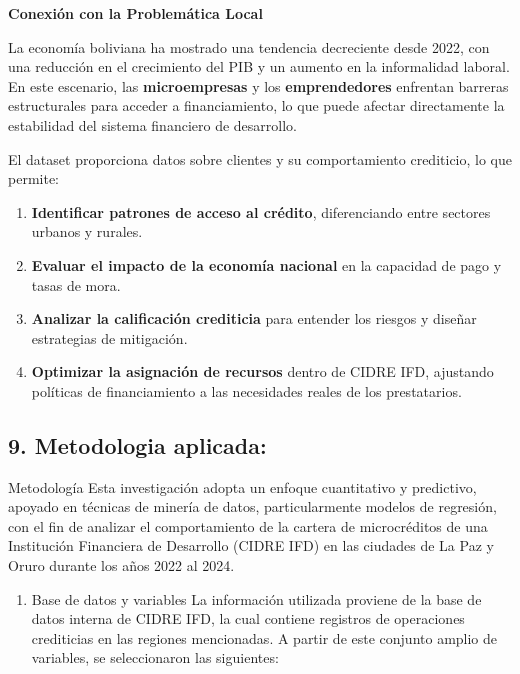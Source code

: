 \documentclass[Royal,times,sageh]{sagej}
\providecommand{\tightlist}{%
  \setlength{\itemsep}{0pt}\setlength{\parskip}{0pt}}
\begin{document}
\textbf{Conexión con la Problemática Local}

La economía boliviana ha mostrado una tendencia decreciente desde 2022,
con una reducción en el crecimiento del PIB y un aumento en la
informalidad laboral. En este escenario, las \textbf{microempresas} y
los \textbf{emprendedores} enfrentan barreras estructurales para acceder
a financiamiento, lo que puede afectar directamente la estabilidad del
sistema financiero de desarrollo.

El dataset proporciona datos sobre clientes y su comportamiento
crediticio, lo que permite:

\begin{enumerate}
\def\labelenumi{\arabic{enumi}.}
\item
  \textbf{Identificar patrones de acceso al crédito}, diferenciando
  entre sectores urbanos y rurales.
\item
  \textbf{Evaluar el impacto de la economía nacional} en la capacidad de
  pago y tasas de mora.
\item
  \textbf{Analizar la calificación crediticia} para entender los riesgos
  y diseñar estrategias de mitigación.
\item
  \textbf{Optimizar la asignación de recursos} dentro de CIDRE IFD,
  ajustando políticas de financiamiento a las necesidades reales de los
  prestatarios.
\end{enumerate}

\subsection{\texorpdfstring{9. \textbf{Metodologia
aplicada:}}{9. Metodologia aplicada:}}\label{metodologia-aplicada}

Metodología Esta investigación adopta un enfoque cuantitativo y
predictivo, apoyado en técnicas de minería de datos, particularmente
modelos de regresión, con el fin de analizar el comportamiento de la
cartera de microcréditos de una Institución Financiera de Desarrollo
(CIDRE IFD) en las ciudades de La Paz y Oruro durante los años 2022 al
2024.

\begin{enumerate}
\def\labelenumi{\arabic{enumi}.}
\tightlist
\item
  Base de datos y variables La información utilizada proviene de la base
  de datos interna de CIDRE IFD, la cual contiene registros de
  operaciones crediticias en las regiones mencionadas. A partir de este
  conjunto amplio de variables, se seleccionaron las siguientes:
\end{enumerate}
\end{document}
